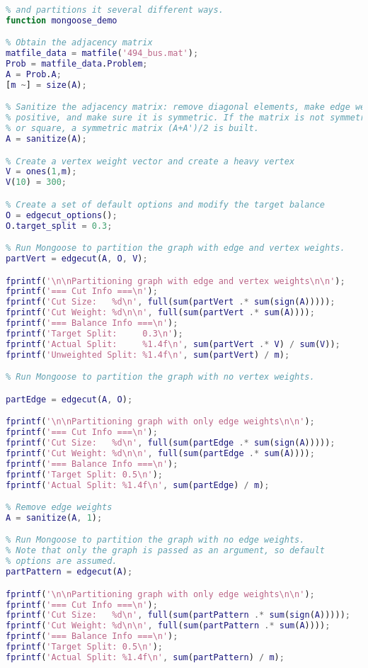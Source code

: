 \documentclass[letter]{article}
\begin{document}
\begin{lstlisting}[language=MATLAB]
% A simple demo to demonstrate Mongoose. Reads in a matrix, sanitizes it,
% and partitions it several different ways.
function mongoose_demo

% Obtain the adjacency matrix
matfile_data = matfile('494_bus.mat');
Prob = matfile_data.Problem;
A = Prob.A;
[m ~] = size(A);

% Sanitize the adjacency matrix: remove diagonal elements, make edge weights 
% positive, and make sure it is symmetric. If the matrix is not symmetric 
% or square, a symmetric matrix (A+A')/2 is built.
A = sanitize(A);

% Create a vertex weight vector and create a heavy vertex
V = ones(1,m);
V(10) = 300;

% Create a set of default options and modify the target balance
O = edgecut_options();
O.target_split = 0.3;

% Run Mongoose to partition the graph with edge and vertex weights.
partVert = edgecut(A, O, V);

fprintf('\n\nPartitioning graph with edge and vertex weights\n\n');
fprintf('=== Cut Info ===\n');
fprintf('Cut Size:   %d\n', full(sum(partVert .* sum(sign(A)))));
fprintf('Cut Weight: %d\n\n', full(sum(partVert .* sum(A))));
fprintf('=== Balance Info ===\n');
fprintf('Target Split:     0.3\n');
fprintf('Actual Split:     %1.4f\n', sum(partVert .* V) / sum(V));
fprintf('Unweighted Split: %1.4f\n', sum(partVert) / m);

% Run Mongoose to partition the graph with no vertex weights.

partEdge = edgecut(A, O);

fprintf('\n\nPartitioning graph with only edge weights\n\n');
fprintf('=== Cut Info ===\n');
fprintf('Cut Size:   %d\n', full(sum(partEdge .* sum(sign(A)))));
fprintf('Cut Weight: %d\n\n', full(sum(partEdge .* sum(A))));
fprintf('=== Balance Info ===\n');
fprintf('Target Split: 0.5\n');
fprintf('Actual Split: %1.4f\n', sum(partEdge) / m);

% Remove edge weights
A = sanitize(A, 1);

% Run Mongoose to partition the graph with no edge weights.
% Note that only the graph is passed as an argument, so default
% options are assumed.
partPattern = edgecut(A);

fprintf('\n\nPartitioning graph with only edge weights\n\n');
fprintf('=== Cut Info ===\n');
fprintf('Cut Size:   %d\n', full(sum(partPattern .* sum(sign(A)))));
fprintf('Cut Weight: %d\n\n', full(sum(partPattern .* sum(A))));
fprintf('=== Balance Info ===\n');
fprintf('Target Split: 0.5\n');
fprintf('Actual Split: %1.4f\n', sum(partPattern) / m);


\end{lstlisting}
\end{document}
